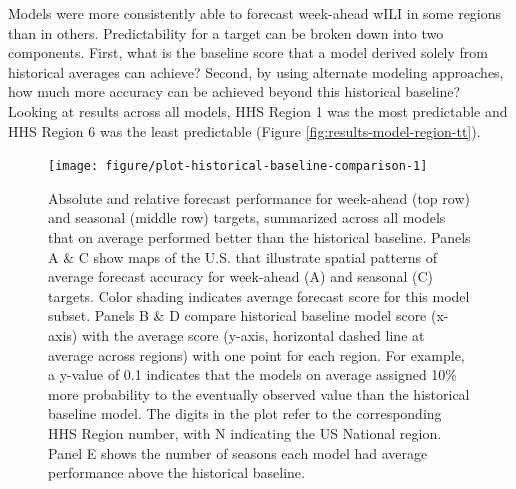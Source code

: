 \documentclass[9pt,twocolumn,twoside]{pnas-new}\usepackage[]{graphicx}\usepackage[]{color}
\newenvironment{knitrout}{}{} %
\begin{document}
Models were more consistently able to forecast week-ahead wILI in some regions than in others.
Predictability for a target can be broken down into two components. 
First, what is the baseline score that a model derived solely from historical averages can achieve? 
Second, by using alternate modeling approaches, how much more accuracy can be achieved beyond this historical baseline? 
Looking at results across all models,
HHS Region 1 was the most predictable and HHS Region 6 was the least predictable (Figure \ref{fig:results-model-region-tt}).








\begin{knitrout}
\color{fgcolor}\begin{figure}
\texttt{[image: figure/plot-historical-baseline-comparison-1]} \caption[Absolute and relative forecast performance for week-ahead (top row) and seasonal (middle row) targets, summarized across all models that on average performed better than the historical baseline]{Absolute and relative forecast performance for week-ahead (top row) and seasonal (middle row) targets, summarized across all models that on average performed better than the historical baseline. Panels A \& C show maps of the U.S. that illustrate spatial patterns of average forecast accuracy for week-ahead (A) and seasonal (C) targets. Color shading indicates average forecast score for this model subset. Panels B \& D compare historical baseline model score (x-axis) with the average score (y-axis, horizontal dashed line at average across regions) with one point for each region. For example, a y-value of 0.1 indicates that the models on average assigned 10\% more probability to the eventually observed value than the historical baseline model. The digits in the plot refer to the corresponding HHS Region number, with N indicating the US National region. Panel E shows the number of seasons each model had average performance above the historical baseline.}\label{fig:plot-historical-baseline-comparison}
\end{figure}


\end{knitrout}
\end{document}
